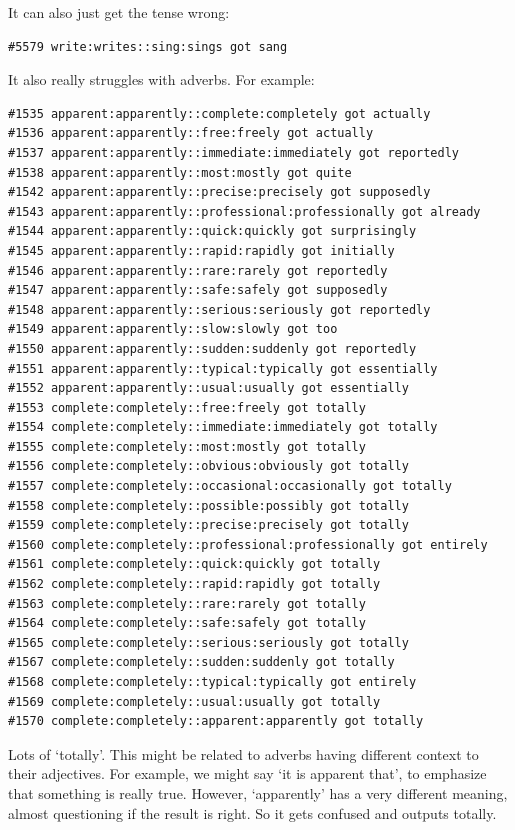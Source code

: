 \documentclass[12pt]{article}
\theoremstyle{definitionstyle}
\begin{document}
\begin{enumerate}[leftmargin=\labelsep]
\begin{enumerate}[label=\textbf{(\alph*)}]
                 It can also just get the tense wrong:
                 \begin{lstlisting}
#5579 write:writes::sing:sings got sang
                 \end{lstlisting}

                 It also really struggles with adverbs. For example:
                 \begin{lstlisting}
#1535 apparent:apparently::complete:completely got actually
#1536 apparent:apparently::free:freely got actually
#1537 apparent:apparently::immediate:immediately got reportedly
#1538 apparent:apparently::most:mostly got quite
#1542 apparent:apparently::precise:precisely got supposedly
#1543 apparent:apparently::professional:professionally got already
#1544 apparent:apparently::quick:quickly got surprisingly
#1545 apparent:apparently::rapid:rapidly got initially
#1546 apparent:apparently::rare:rarely got reportedly
#1547 apparent:apparently::safe:safely got supposedly
#1548 apparent:apparently::serious:seriously got reportedly
#1549 apparent:apparently::slow:slowly got too
#1550 apparent:apparently::sudden:suddenly got reportedly
#1551 apparent:apparently::typical:typically got essentially
#1552 apparent:apparently::usual:usually got essentially
#1553 complete:completely::free:freely got totally
#1554 complete:completely::immediate:immediately got totally
#1555 complete:completely::most:mostly got totally
#1556 complete:completely::obvious:obviously got totally
#1557 complete:completely::occasional:occasionally got totally
#1558 complete:completely::possible:possibly got totally
#1559 complete:completely::precise:precisely got totally
#1560 complete:completely::professional:professionally got entirely
#1561 complete:completely::quick:quickly got totally
#1562 complete:completely::rapid:rapidly got totally
#1563 complete:completely::rare:rarely got totally
#1564 complete:completely::safe:safely got totally
#1565 complete:completely::serious:seriously got totally
#1567 complete:completely::sudden:suddenly got totally
#1568 complete:completely::typical:typically got entirely
#1569 complete:completely::usual:usually got totally
#1570 complete:completely::apparent:apparently got totally
                 \end{lstlisting}
                 Lots of `totally'. This might be related to adverbs having different context to their adjectives. For example, we might say `it is apparent that', to emphasize that something is really true. However, `apparently' has a very different meaning, almost questioning if the result is right. So it gets confused and outputs totally.
        \end{enumerate}
    \end{enumerate}
\end{document}
